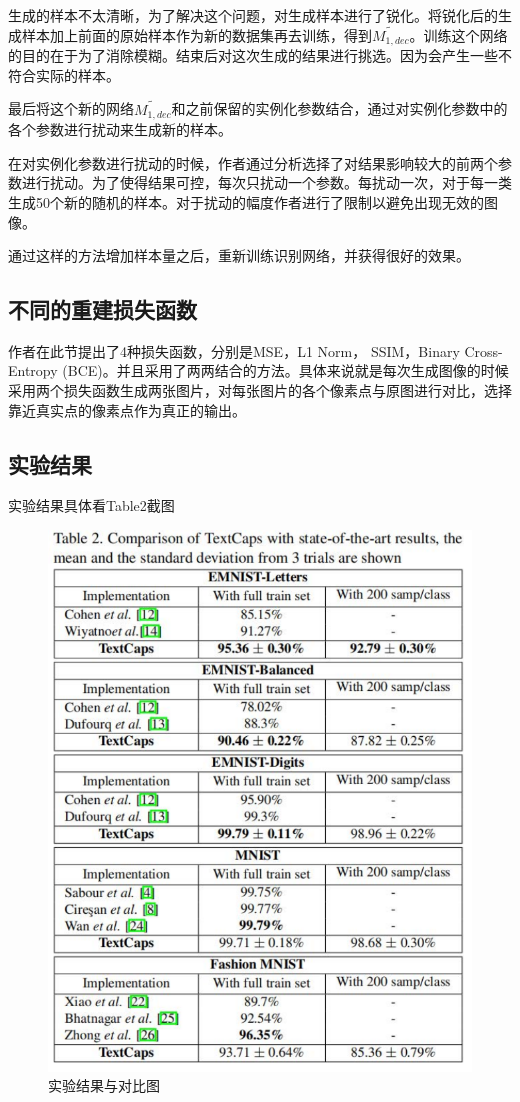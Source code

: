 生成的样本不太清晰，为了解决这个问题，对生成样本进行了锐化。将锐化后的生成样本加上前面的原始样本作为新的数据集再去训练，得到$\widetilde{M_{1,dec}}$。训练这个网络的目的在于为了消除模糊。结束后对这次生成的结果进行挑选。因为会产生一些不符合实际的样本。

最后将这个新的网络$\widetilde{M_{1,dec}}$和之前保留的实例化参数结合，通过对实例化参数中的各个参数进行扰动来生成新的样本。

在对实例化参数进行扰动的时候，作者通过分析选择了对结果影响较大的前两个参数进行扰动。为了使得结果可控，每次只扰动一个参数。每扰动一次，对于每一类生成50个新的随机的样本。对于扰动的幅度作者进行了限制以避免出现无效的图像。


通过这样的方法增加样本量之后，重新训练识别网络，并获得很好的效果。









\subsection{不同的重建损失函数}
作者在此节提出了4种损失函数，分别是MSE，L1 Norm， SSIM，Binary Cross-Entropy (BCE)。并且采用了两两结合的方法。具体来说就是每次生成图像的时候采用两个损失函数生成两张图片，对每张图片的各个像素点与原图进行对比，选择靠近真实点的像素点作为真正的输出。
\subsection{实验结果}
实验结果具体看Table2截图
\begin{figure}[!htbp]
	\centering
	\includegraphics[scale = 1]{Fig/results.pdf}
	\caption{实验结果与对比图}
	\label{fig:results}
\end{figure}






